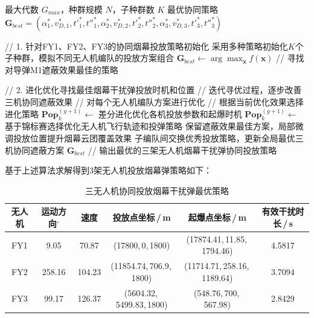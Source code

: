 \documentclass[withoutpreface,bwprint]{cumcmthesis}
\numberwithin{equation}{section} %
\numberwithin{figure}{section} %
\numberwithin{table}{section}  %
\begin{document}
\begin{algorithm}[H]
\caption{基于混合进化算法的三架无人机协同投放策略优化}
\label{alg:hybrid_evolution_problem4}
\begin{algorithmic}[1]
    \Require 最大代数 $G_{max}$，种群规模 $N$，子种群数 $K$
    \Ensure 最优协同策略 $\mathbf{G}_{best} = (\alpha_1^*, v_{D,1}^*, t'_1^*, t''_1^*, \alpha_2^*, v_{D,2}^*, t'_2^*, t''_2^*, \alpha_3^*, v_{D,3}^*, t'_3^*, t''_3^*)$
    
    \Statex // 1. 针对FY1、FY2、FY3的协同烟幕投放策略初始化
    \State 采用多种策略初始化$K$个子种群，模拟不同无人机编队的投放方案组合
    \State $\mathbf{G}_{best} \leftarrow \arg\max_{\mathbf{x}} f(\mathbf{x})$ // 寻找对导弹M1遮蔽效果最佳的策略
    
    \Statex // 2. 进化优化寻找最佳烟幕干扰弹投放时机和位置
     // 迭代寻优过程，逐步改善三机协同遮蔽效果
         // 对每个无人机编队方案进行优化
             // 根据当前优化效果选择进化策略
                \State $\mathbf{Pop}_k^{(g+1)} \leftarrow$ 差分进化优化各机投放参数和起爆时机
            \Else
                \State $\mathbf{Pop}_k^{(g+1)} \leftarrow$ 基于锦标赛选择优化无人机飞行轨迹和投弹策略
            \EndIf
            \State 保留遮蔽效果最佳方案，局部微调投放位置提升烟幕云团覆盖效果
        \EndFor
        \State 子编队间交换优秀投放策略，更新全局最优三机协同遮蔽方案
    \EndFor
    \State \Return $\mathbf{G}_{best}$ // 输出最优的三架无人机烟幕干扰弹协同投放策略
\end{algorithmic}
\end{algorithm}

基于上述算法求解得到3架无人机投放烟幕弹策略如下：
\begin{table}[H]
  \centering
  \caption{三无人机协同投放烟幕干扰弹最优策略}
  \label{tab:q3}
  \begin{tabular}{cccccc}
    \toprule
    无人机
    & 运动方向$^\circ$
    & 速度
    & \centering 投放点坐标\,/\,m
    & \centering 起爆点坐标\,/\,m
    & 有效干扰时长\,/\,s \\
    \midrule
    FY1 & 9.05   & 70.87 & (17800,\,0,\,1800) & (17874.41,\,11.85,\,1794.46) & 4.5817 \\
    FY2 & 258.16 & 104.23 & (11854.74,\,706.9,\,1800) & (11714.71,\,258.16,\,1189.64) & 3.7094 \\
    FY3 & 99.17  & 126.37 & (5604.32,\,5499.83,\,1800) & (548.76,\,700,\,567.98) & 2.8429 \\
    \bottomrule
  \end{tabular}
\end{table}
\end{document}
